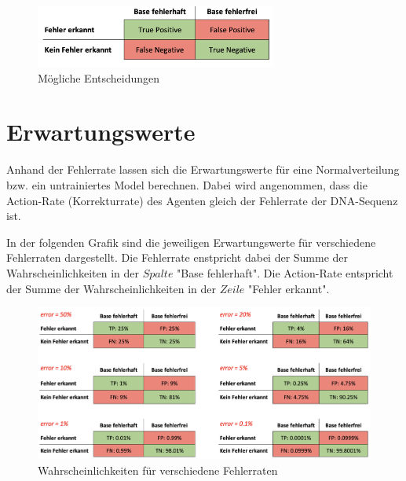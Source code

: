 \documentclass[oneside,bibliography=totocnumbered,BCOR=5mm]{scrbook}%
\theoremstyle{definition}
\theoremstyle{definition}
\theoremstyle{definition}
\theoremstyle{definition}
\theoremstyle{definition}
\theoremstyle{definition}
\begin{document}
\begin{figure}
  \centering
  \includegraphics[width=300px,keepaspectratio]{images/TP_FN.png}
  \caption{Mögliche Entscheidungen}
  \label{TPFN}
  \end{figure}
%

\section{Erwartungswerte}

Anhand der Fehlerrate lassen sich die Erwartungswerte für eine Normalverteilung
bzw. ein untrainiertes Model berechnen. Dabei wird angenommen, dass die Action-Rate (Korrekturrate)
des Agenten gleich der Fehlerrate der DNA-Sequenz ist.

In der folgenden Grafik sind die jeweiligen Erwartungswerte für verschiedene Fehlerraten
dargestellt. Die Fehlerrate enstpricht dabei der Summe der Wahrscheinlichkeiten in der
\(Spalte\) "Base fehlerhaft". Die Action-Rate entspricht der Summe der Wahrscheinlichkeiten
in der \(Zeile\) "Fehler erkannt".

\begin{figure}
  \centering
  \includegraphics[width=\textwidth,keepaspectratio]{images/error_rate.png}
  \caption{Wahrscheinlichkeiten für verschiedene Fehlerraten}
  \label{probabliltiesForErrorRates}
\end{figure}
\end{document}
